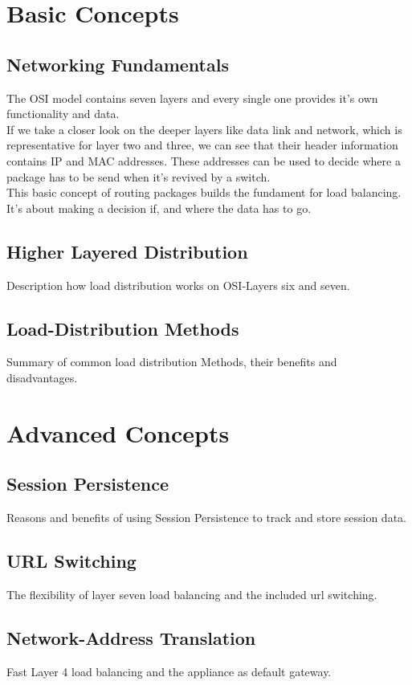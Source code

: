 \documentclass[12p]{article}
\begin{document}
	\newpage
	\section{Basic Concepts}
	\subsection{Networking Fundamentals}
	The OSI model contains seven layers and every single one provides it's own functionality and data.\\
	If we take a closer look on the deeper layers like data link and network, which is representative for layer two and three, we can see that their header information contains IP and MAC addresses. These addresses can be used to decide where a package has to be send when it's revived by a switch.\\
	This basic concept of routing packages builds the fundament for load balancing. It's about making a decision if, and where the data has to go. \cite{lb_SFC}
	\subsection{Higher Layered Distribution}
	Description how load distribution works on OSI-Layers six and seven.
	\subsection{Load-Distribution Methods}
	Summary of common load distribution Methods, their benefits and disadvantages.
	
	\newpage
	\section{Advanced Concepts}
	\subsection{Session Persistence}
	Reasons and benefits of using Session Persistence to track and store session data.
	\subsection{URL Switching}
	The flexibility of layer seven load balancing and the included url switching.
	\subsection{Network-Address Translation}
	Fast Layer 4 load balancing and the appliance as default gateway.
	
\end{document}
